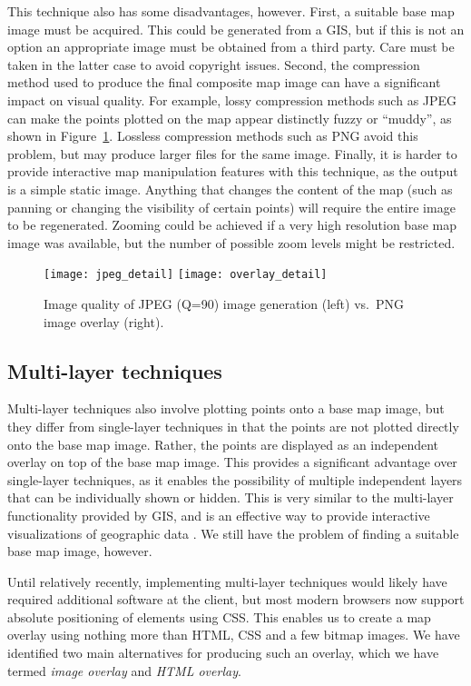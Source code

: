 \documentclass[acmnow]{acmtrans2m}
\begin{document}
This technique also has some disadvantages, however. First, a suitable
base map image must be acquired. This could be generated from a GIS, but
if this is not an option an appropriate image must be obtained from a
third party. Care must be taken in the latter case to avoid copyright
issues. Second, the compression method used to produce the final
composite map image can have a significant impact on visual quality. For
example, lossy compression methods such as JPEG can make the points
plotted on the map appear distinctly fuzzy or ``muddy'', as shown in
Figure~\ref{fig-image-quality}. Lossless compression methods such as PNG
avoid this problem, but may produce larger files for the same image.
Finally, it is harder to provide interactive map manipulation features
with this technique, as the output is a simple static image. Anything
that changes the content of the map (such as panning or changing the
visibility of certain points) will require the entire image to be
regenerated. Zooming could be achieved if a very high resolution base
map image was available, but the number of possible zoom levels might be
restricted.


\begin{figure}
	\centering
	\texttt{[image: jpeg\_detail]}
	\texttt{[image: overlay\_detail]}
	\caption{Image quality of JPEG (Q=90) image generation (left) vs.\
	PNG image overlay (right).}
	\label{fig-image-quality}
\end{figure}


\subsection{Multi-layer techniques}
\label{sec-overlay}

Multi-layer techniques also involve plotting points onto a base map
image, but they differ from single-layer techniques in that the points
are not plotted directly onto the base map image. Rather, the points are
displayed as an independent overlay on top of the base map image. This
provides a significant advantage over single-layer techniques, as it
enables the possibility of multiple independent layers that can be
individually shown or hidden. This is very similar to the multi-layer
functionality provided by GIS, and is an effective way to provide
interactive visualizations of geographic data
\cite{Wood-J-1996-vis,MacE-AM-1998-GIS}. We still have the problem of
finding a suitable base map image, however.

Until relatively recently, implementing multi-layer techniques would likely
have required additional software at the client, but most modern
browsers now support absolute positioning of elements using CSS. This
enables us to create a map overlay using nothing more than HTML, CSS and
a few bitmap images. We have identified two main alternatives for
producing such an overlay, which we have termed \emph{image overlay} and
\emph{HTML overlay}.
\end{document}
